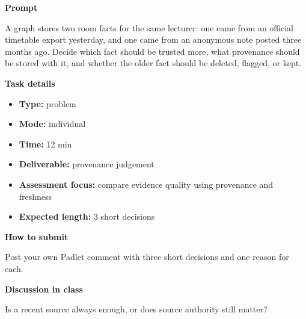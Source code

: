 \documentclass[11pt]{article}
\begin{document}
\begin{tcolorbox}[colback=white,colframe=MidnightBlue,title={Q3 Structured Problem},fonttitle=\bfseries,breakable]
\begin{center}
\end{center}

{\large\bfseries\color{MidnightBlue} Prompt}\par\medskip
A graph stores two room facts for the same lecturer: one came from an official timetable export yesterday, and one came from an anonymous note posted three months ago. Decide which fact should be trusted more, what provenance should be stored with it, and whether the older fact should be deleted, flagged, or kept.

{\large\bfseries\color{MidnightBlue} Task details}\par\medskip
\begin{itemize}\item \textbf{Type:} problem
\item \textbf{Mode:} individual
\item \textbf{Time:} 12 min
\item \textbf{Deliverable:} provenance judgement
\item \textbf{Assessment focus:} compare evidence quality using provenance and freshness
\item \textbf{Expected length:} 3 short decisions\end{itemize}

{\large\bfseries\color{MidnightBlue} How to submit}\par\medskip
Post your own Padlet comment with three short decisions and one reason for each.

{\large\bfseries\color{MidnightBlue} Discussion in class}\par\medskip
Is a recent source always enough, or does source authority still matter?


\end{tcolorbox}
\end{document}
